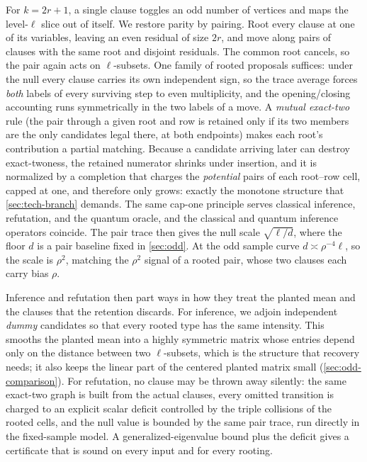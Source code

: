 \documentclass[11pt]{article}
\theoremstyle{definition}
\theoremstyle{remark}
\newcommand{\1}{\mathbf 1}
\numberwithin{equation}{section}
\begin{document}
For $k=2r+1$, a single clause toggles an odd number of vertices and
maps the level-$\ell$ slice out of itself.  We restore parity by
pairing.  Root every clause at one of its variables, leaving an even
residual of size $2r$, and move along pairs of clauses with the same
root and disjoint residuals.  The common root cancels, so the pair
again acts on $\ell$-subsets.  One family of rooted
proposals suffices: under the null every clause carries its own
independent sign, so the trace average forces \emph{both} labels of
every surviving step to even multiplicity, and the opening/closing
accounting runs symmetrically in the two labels of a move.  A
\emph{mutual exact-two} rule (the pair through a given root and row is
retained only if its two members are the only candidates legal there,
at both endpoints) makes each root's contribution a partial matching.
Because a candidate arriving later can destroy exact-twoness, the
retained numerator shrinks under insertion, and it is normalized by a
completion that charges the \emph{potential} pairs of each root--row
cell, capped at one, and therefore only grows: exactly the monotone
structure that \cref{sec:tech-branch} demands.  The same cap-one
principle serves classical inference, refutation, and the quantum
oracle, and the classical and quantum inference operators coincide.  The pair trace then gives the null scale $\sqrt{\ell/d}$,
where the floor $d$ is a pair baseline fixed in \cref{sec:odd}.  At the
odd sample curve $d\asymp\rho^{-4}\ell$, so the scale is $\rho^{2}$,
matching the $\rho^{2}$ signal of a rooted pair, whose two clauses each
carry bias $\rho$.

Inference and refutation then part ways in how they treat the planted
mean and the clauses that the retention discards.  For inference, we
adjoin independent \emph{dummy} candidates so that every rooted type
has the same intensity.  This smooths the planted mean into a highly
symmetric matrix whose entries depend only on the distance between two
$\ell$-subsets, which is the structure that recovery needs; it also
keeps the linear part of the centered planted matrix small
(\cref{sec:odd-comparison}).  For refutation, no clause may be thrown
away silently: the same exact-two graph is built from the actual
clauses, every omitted transition is charged to an explicit scalar
deficit controlled by the triple collisions of the rooted cells, and
the null value is bounded by the same pair trace, run directly in the
fixed-sample model.  A generalized-eigenvalue bound plus the deficit
gives a certificate that is sound on every input and for every
rooting.
\end{document}
